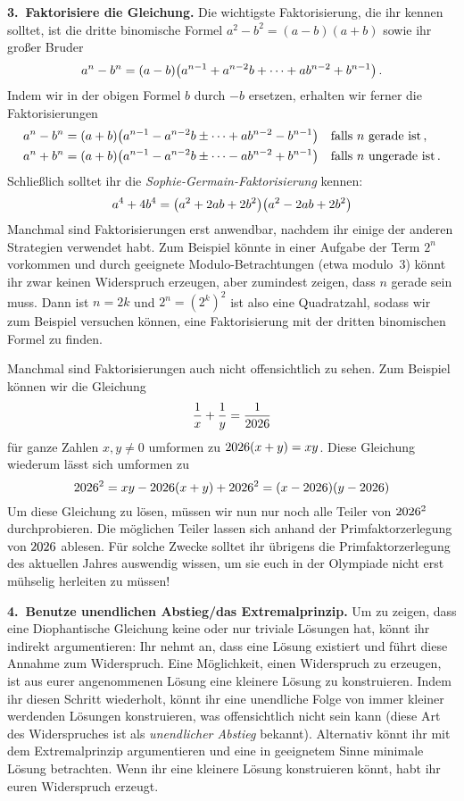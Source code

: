 \textbf{3.~Faktorisiere die Gleichung.} Die wichtigste Faktorisierung, die ihr kennen solltet, ist die dritte binomische Formel $a^2-b^2=(a-b)(a+b)$ sowie ihr großer Bruder
\begin{equation*}
	a^n-b^n=(a-b)\parens*{a^{n-1}+a^{n-2}b+\dotsb+ab^{n-2}+b^{n-1}}\,.
\end{equation*}
Indem wir in der obigen Formel $b$ durch $-b$ ersetzen, erhalten wir ferner die Faktorisierungen
\begin{align*}
	a^n-b^n&=(a+b)\parens*{a^{n-1}-a^{n-2}b\pm\dotsb+ab^{n-2}-b^{n-1}}\quad\text{falls $n$ gerade ist}\,,\\
	a^n+b^n&=(a+b)\parens*{a^{n-1}-a^{n-2}b\pm\dotsb-ab^{n-2}+b^{n-1}}\quad\text{falls $n$ ungerade ist}\,.
\end{align*}
Schließlich solltet ihr die \emph{Sophie-Germain-Faktorisierung} kennen:
\begin{equation*}
	a^4+4b^4=\parens*{a^2+2ab+2b^2}\parens*{a^2-2ab+2b^2}
\end{equation*}
Manchmal sind Faktorisierungen erst anwendbar, nachdem ihr einige der anderen Strategien verwendet habt. Zum Beispiel könnte in einer Aufgabe der Term $2^n$ vorkommen und durch geeignete Modulo-Betrachtungen (etwa modulo~$3$) könnt ihr zwar keinen Widerspruch erzeugen, aber zumindest zeigen, dass $n$ gerade sein muss. Dann ist $n=2k$ und $2^n=(2^{k})^2$ ist also eine Quadratzahl, sodass wir zum Beispiel versuchen können, eine Faktorisierung mit der dritten binomischen Formel zu finden.

Manchmal sind Faktorisierungen auch nicht offensichtlich zu sehen. Zum Beispiel können wir die Gleichung
\begin{equation*}
	\frac 1x+\frac 1y=\frac1{\the\year}
\end{equation*}
für ganze Zahlen $x,y\neq 0$ umformen zu $\the\year(x+y)=xy$. Diese Gleichung wiederum lässt sich umformen zu
\begin{equation*}
	\the\year^2=xy-\the\year(x+y)+\the\year^2=(x-\the\year)(y-\the\year)
\end{equation*} 
Um diese Gleichung zu lösen, müssen wir nun nur noch alle Teiler von $\the\year^2$ durchprobieren. Die möglichen Teiler lassen sich anhand der Primfaktorzerlegung von $\the\year$ ablesen. Für solche Zwecke solltet ihr übrigens die Primfaktorzerlegung des aktuellen Jahres auswendig wissen, um sie euch in der Olympiade nicht erst mühselig herleiten zu müssen!

\textbf{4.~Benutze unendlichen Abstieg/das Extremalprinzip.} Um zu zeigen, dass eine Diophantische Gleichung keine oder nur triviale Lösungen hat, könnt ihr indirekt argumentieren: Ihr nehmt an, dass eine Lösung existiert und führt diese Annahme zum Widerspruch. Eine Möglichkeit, einen Widerspruch zu erzeugen, ist aus eurer angenommenen Lösung eine kleinere Lösung zu konstruieren. Indem ihr diesen Schritt wiederholt, könnt ihr eine unendliche Folge von immer kleiner werdenden Lösungen konstruieren, was offensichtlich nicht sein kann (diese Art des Widerspruches ist als \emph{unendlicher Abstieg} bekannt). Alternativ könnt ihr mit dem Extremalprinzip argumentieren und eine in geeignetem Sinne minimale Lösung betrachten. Wenn ihr eine kleinere Lösung konstruieren könnt, habt ihr euren Widerspruch erzeugt.

